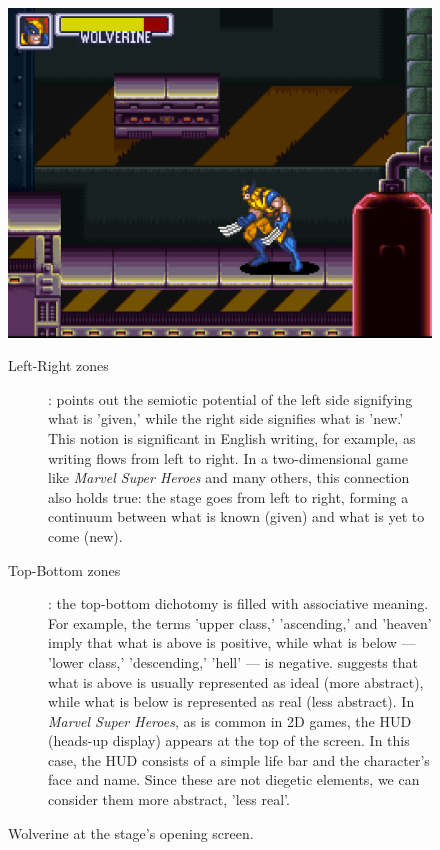 \documentclass[english]{textolivre}
\begin{document}
\begin{figure}[htbp]
\centering
\begin{minipage}[t]{0.6\textwidth}
\includegraphics[width=\textwidth]{fig-010.png}
\caption{Wolverine at the stage’s opening screen.}
\label{fig010}
\end{minipage}
\begin{minipage}[t]{\textwidth}
\small
\begin{description}
    \item[Left-Right zones]: \textcite[p. 201-2]{van_leeuwen_introducing_2005} points out the semiotic potential of the left side signifying what is 'given,' while the right side signifies what is 'new.' This notion is significant in English writing, for example, as writing flows from left to right. In a two-dimensional game like \textit{Marvel Super Heroes} and many others, this connection also holds true: the stage goes from left to right, forming a continuum between what is known (given) and what is yet to come (new).

    \item[Top-Bottom zones]: the top-bottom dichotomy is filled with associative meaning. For example, the terms 'upper class,' 'ascending,' and 'heaven' imply that what is above is positive, while what is below — 'lower class,' 'descending,' 'hell' — is negative. \textcite[p. 204-5]{van_leeuwen_introducing_2005} suggests that what is above is usually represented as ideal (more abstract), while what is below is represented as real (less abstract). In \textit{Marvel Super Heroes}, as is common in 2D games, the HUD (heads-up display) appears at the top of the screen. In this case, the HUD consists of a simple life bar and the character's face and name. Since these are not diegetic elements, we can consider them more abstract, 'less real'.


\end{description}
\end{minipage}
\end{figure}
\end{document}
